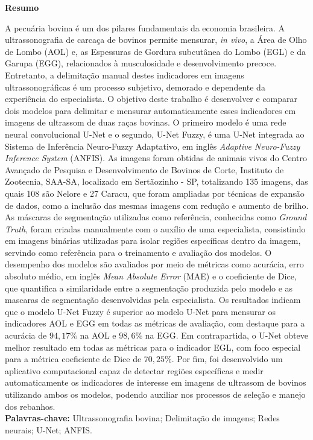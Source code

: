 \begin{center}
    {\LARGE \textbf{Resumo}}
\end{center}
A pecuária bovina é um dos pilares fundamentais da economia brasileira.  A ultrassonografia de carcaça de bovinos permite
mensurar, \textit{in vivo}, a Área de Olho de Lombo (AOL) e, as Espessuras de Gordura subcutânea do Lombo (EGL) e da Garupa (EGG), relacionados à musculosidade e desenvolvimento precoce. Entretanto, a delimitação manual destes indicadores em imagens ultrassonográficas é um processo subjetivo, demorado e dependente da experiência do especialista. O objetivo deste trabalho é desenvolver e comparar dois modelos para  delimitar e mensurar automaticamente esses indicadores em imagens de ultrassom de duas raças bovinas. O primeiro modelo é uma rede neural convolucional U-Net  e o segundo, U-Net Fuzzy, é uma U-Net integrada ao Sistema de Inferência Neuro-Fuzzy Adaptativo, em inglês \textit{Adaptive Neuro-Fuzzy Inference System} (ANFIS). As imagens foram obtidas de animais vivos do Centro Avançado de Pesquisa e Desenvolvimento de Bovinos de Corte, Instituto de Zootecnia, SAA-SA, localizado em Sertãozinho - SP, totalizando 135 imagens, das quais 108 são Nelore e 27 Caracu, que foram ampliadas por técnicas de
expansão de dados, como a inclusão das mesmas imagens com redução e aumento de brilho. As máscaras de segmentação utilizadas como referência, conhecidas como \textit{Ground Truth}, foram criadas manualmente com o auxílio de uma especialista, consistindo em imagens binárias utilizadas para isolar regiões específicas dentro da imagem, servindo como referência para o treinamento e avaliação dos modelos. O desempenho dos modelos são avaliados por meio de métricas como acurácia, erro absoluto médio, em inglês \textit{Mean Absolute Error} (MAE) e o coeficiente de Dice, que quantifica a similaridade entre a segmentação produzida pelo modelo e as mascaras de segmentação desenvolvidas pela especialista. Os resultados indicam que o modelo U-Net Fuzzy é superior ao modelo U-Net para mensurar os indicadores AOL e EGG em todas as métricas de avaliação, com destaque para a acurácia de $94,17\%$ na AOL e $98,6\%$ na EGG. Em contrapartida, o U-Net obteve melhor resultado em todas as métricas para o indicador EGL, com  foco especial para a métrica coeficiente de Dice de $70,25\%$. Por fim, foi desenvolvido um aplicativo computacional capaz de detectar regiões específicas e medir automaticamente os indicadores de interesse em imagens de ultrassom de bovinos utilizando ambos os modelos, podendo
auxiliar nos processos de seleção e manejo dos rebanhos.
\vspace{1cm}
\\
\textbf{Palavras-chave:} Ultrassonografia bovina; Delimitação de imagens; Redes neurais; U-Net;
ANFIS.



